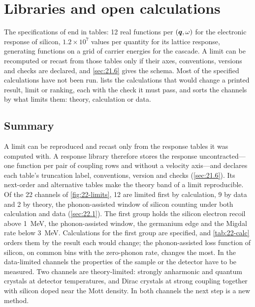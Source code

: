 \chapter{Libraries and open calculations}\label{chap:33}

The specifications of  end in tables: 12 real functions per $(\bm{q},\omega)$ for the electronic response of silicon, $1.2\times10^7$ values per quantity for its lattice response, generating functions on a grid of carrier energies for the cascade. A limit can be recomputed or recast from those tables only if their axes, conventions, versions and checks are declared, and \cref{sec:21.6} gives the schema. Most of the specified calculations have not been run.  lists the calculations that would change a printed result, limit or ranking, each with the check it must pass, and sorts the channels by what limits them: theory, calculation or data.



\section*{Summary}

A limit can be reproduced and recast only from the response tables it was computed with. A response library therefore stores the response uncontracted—one function per pair of coupling rows and without a velocity axis—and declares each table's truncation label, conventions, version and checks (\cref{sec:21.6}). Its next-order and alternative tables make the theory band of a limit reproducible. Of the 22 channels of \cref{fig:22-limits}, 12 are limited first by calculation, 9 by data and 2 by theory, the phonon-assisted window of silicon counting under both calculation and data (\cref{sec:22.1}). The first group holds the silicon electron recoil above \SI{1}{MeV}, the phonon-assisted window, the germanium edge and the Migdal rate below \SI{3}{MeV}. Calculations for the first group are specified, and \cref{tab:22-calc} orders them by the result each would change; the phonon-assisted loss function of silicon, on common bins with the zero-phonon rate, changes the most. In the data-limited channels the properties of the sample or the detector have to be measured. Two channels are theory-limited: strongly anharmonic and quantum crystals at detector temperatures, and Dirac crystals at strong coupling together with silicon doped near the Mott density. In both channels the next step is a new method.

\printbibliography[heading=subbibliography]
